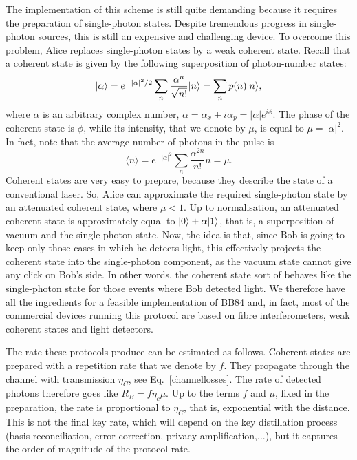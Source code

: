 \documentclass[a4paper]{article}
\begin{document}
The implementation of this scheme is still quite demanding because it requires the preparation of single-photon states. Despite tremendous progress in single-photon sources, this is still an expensive and challenging device. To overcome this problem, Alice replaces single-photon states by a weak coherent state. Recall that a coherent state is given by the following superposition of photon-number states:
\begin{equation}
\label{coherentstate}
|\alpha\rangle=e^{-|\alpha|^2/2}\sum_n \frac{\alpha^n}{\sqrt{n!}}|n\rangle=\sum_n p(n)|n\rangle,
\end{equation}
where $\alpha$ is an arbitrary complex number, $\alpha=\alpha_x+i\alpha_p=|\alpha|e^{i\phi}$. The phase of the coherent state is $\phi$, while its intensity, that we denote by $\mu$, is equal to $\mu=|\alpha|^2$. In fact, note that the average number of photons in the pulse is 
\begin{equation}
\langle n\rangle=e^{-|\alpha|^2}\sum_n \frac{\alpha^{2n}}{n!} n = \mu.
\end{equation}
Coherent states are very easy to prepare, because they describe the state of a conventional laser. So, Alice can approximate the required single-photon state by an attenuated coherent state, where $\mu<1$. Up to normalisation, an attenuated coherent state is approximately equal to $|0\rangle + \alpha|1\rangle$, that is, a superposition of vacuum and the single-photon state. Now, the idea is that, since Bob is going to keep only those cases in which he detects light, this effectively projects the coherent state into the single-photon component, as the vacuum state cannot give any click on Bob's side. In other words, the coherent state sort of behaves like the single-photon state for those events where Bob detected light. We therefore have all the ingredients for a feasible implementation of BB84 and, in fact, most of the commercial devices running this protocol are based on fibre interferometers, weak coherent states and light detectors.

The rate these protocols produce can be estimated as follows. Coherent states are prepared with a repetition rate that we denote by $f$. They propagate through the channel with transmission $\eta_C$, see Eq.~\eqref{channellosses}. The rate of detected photons therefore goes like $R_B=f\eta_c\mu$. Up to the terms $f$ and $\mu$, fixed in the preparation, the rate is proportional to $\eta_C$, that is, exponential with the distance. This is not the final key rate, which will depend on the key distillation process (basis reconciliation, error correction, privacy amplification,...), but it captures the order of magnitude of the protocol rate.
\end{document}
